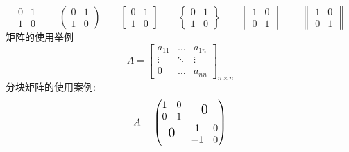 \documentclass{ctexart}
\begin{document}
    \[ 
        \begin{matrix}
            0& 1\\
            1& 0 
        \end{matrix} \qquad 
        \begin{pmatrix} 
            0& 1\\
            1& 0 
        \end{pmatrix}  \qquad
        \begin{bmatrix}
            0&1\\
            1&0
        \end{bmatrix} \qquad 
        \begin{Bmatrix}
            0&1\\
            1&0
        \end{Bmatrix}\qquad
        \begin{vmatrix}
            1&0\\
            0&1
        \end{vmatrix}\qquad 
        \begin{Vmatrix}
            1&0\\
            0&1 
        \end{Vmatrix}
    \]
    矩阵的使用举例
    \[
          A= \begin{bmatrix}
              a_{11} & \dots & a_{1n} \\
              \vdots & \ddots & \vdots \\
              0 & \dots & a_{nn}
          \end{bmatrix}_{n \times n}
    \]
    分块矩阵的使用案例:
    \[
          A= \begin{pmatrix}
            \begin{matrix}
                1&0\\
                0&1
            \end{matrix}
            & \text{\Large 0} \\
            
            \text{\Large 0} &
            \begin{matrix}
                1&0\\
                -1&0
            \end{matrix}
          \end{pmatrix}
    \]
\end{document}

